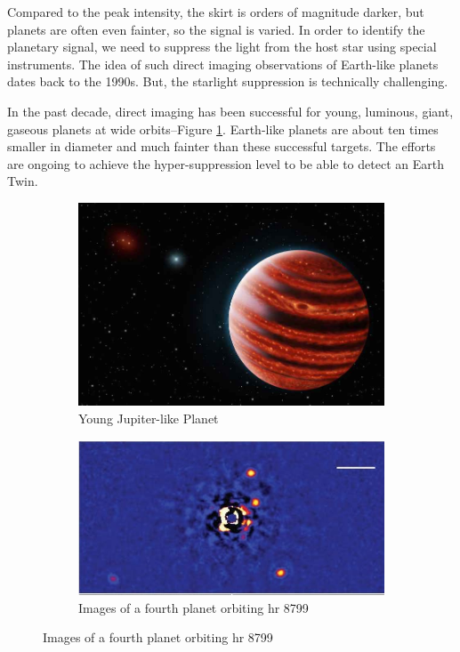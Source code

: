 \documentclass[]{article}
\begin{document}
Compared to the peak intensity,
the skirt is orders of magnitude darker,
but planets are often even fainter,
so the signal is varied.
In order to identify the planetary signal,
we need to suppress the light
from the host star
using special instruments.
The idea of such direct imaging
observations of Earth-like planets
dates back to the 1990s.
But, the starlight suppression
is technically challenging.

In the past decade,
direct imaging has been successful
for young, luminous, giant,
gaseous planets at wide orbits--Figure \ref{fig:young:jupiter0}.
Earth-like planets are about
ten times smaller in diameter
and much fainter than
these successful targets.
The efforts are ongoing to achieve
the hyper-suppression level
to be able to detect an Earth Twin.


\begin{figure}[H]
	\caption{Success with Young Jupiter-like Planets in Distant Orbits}\label{fig:young:jupiter}
	\begin{subfigure}[b]{0.25\textwidth}
		\caption{Young Jupiter-like Planet}\label{fig:young:jupiter0}
		\includegraphics[width=\textwidth]{young-hot-jupiter}
	\end{subfigure}
	\;\;\;
	\begin{subfigure}[b]{0.3\textwidth}
		\caption{ Images of a fourth planet orbiting hr 8799\cite{marois2010images}}\label{fig:young:jupiter1}
		\includegraphics[width=\textwidth]{DirectImaging1.jpg}

\end{subfigure}
\end{figure}
\end{document}
